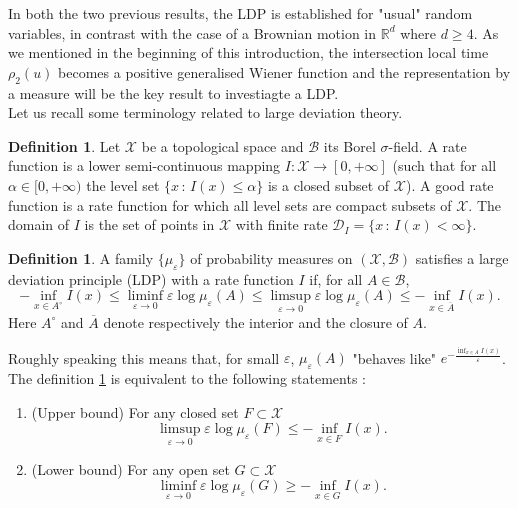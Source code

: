 \documentclass[]{interact}
\newcommand{\R}{{\mathbb{R}}}
\newcommand{\1}{\mathbf{1}}
\theoremstyle{plain}%
\theoremstyle{definition}
\newtheorem{defn}[thm]{Definition}
\theoremstyle{remark}
\begin{document}
In both the two previous results, the LDP is established for "usual" random variables, in contrast with the case of a Brownian motion in $\R^d$ where $d\geqslant 4$. As we mentioned in the beginning of this introduction, the intersection local time $\rho_2(u)$ becomes a positive generalised Wiener function and the representation by a measure will be the key result to investiagte a LDP.\\ 
Let us recall some terminology related to large deviation theory.
\begin{defn} \label{rate} \cite[Chapter 1.]{DZ09}
Let $\mathcal{X}$ be a topological space and $\mathcal{B}$ its Borel $\sigma$-field. A rate function is a lower semi-continuous mapping $I : \mathcal{X} \to [0,+\infty ]$ (such that for all $\alpha \in [0,+\infty )$ the level set $\{x \, :\, I(x)\leqslant \alpha \}$ is a closed subset of $\mathcal{X}$). A good rate function is a rate function for which all level sets are compact subsets of $\mathcal{X}$. The domain of $I$ is the set of points in $\mathcal{X}$ with  finite rate $\mathcal{D}_I=\{ x\,: \, I(x)<\infty \}$.
\end{defn}
\begin{defn}\cite[Chapter 1.]{DZ09}\label{LDP}
A family  $\{\mu_{\varepsilon}\}$ of probability measures on $(\mathcal{X},\mathcal{B})$ satisfies a large deviation principle (LDP) with a rate function $I$ if, for all $A \in \mathcal{B}$,
$$ -\inf _{x\in A^{\circ}} I(x) \leqslant \liminf _{\varepsilon \to 0} \varepsilon \log \mu _\varepsilon (A) \leqslant \limsup _{\varepsilon \to 0} \varepsilon \log \mu _\varepsilon (A) \leqslant - \inf _{x\in  \overline{A}} I(x). $$
Here $A^{\circ}$ and $ \overline{A}$ denote respectively the interior and the closure of $A$.
\end{defn}
\noindent Roughly speaking this means that, for small $\varepsilon$, $\mu _\varepsilon (A)$ "behaves like" $e^{-\frac{ \inf _{x\in A} I(x)}{ \varepsilon }  }$.\\
\noindent The definition \ref{LDP} is equivalent to the following statements :
\begin{enumerate}
\item (Upper bound) For any closed set $F\subset \mathcal{X}$
$$ \limsup_{\varepsilon \to 0}  \varepsilon \log \mu _\varepsilon (F) \leqslant -\inf_{x\in F} I(x). $$
\item (Lower bound) For any open set $G\subset \mathcal{X}$
$$ \liminf_{\varepsilon \to 0}  \varepsilon \log \mu _\varepsilon (G) \geqslant -\inf_{x\in G} I(x). $$
\end{enumerate}
\end{document}
